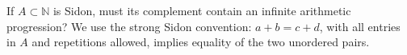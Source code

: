 If $A\subset\mathbb N$ is Sidon, must its complement contain an infinite arithmetic progression? We use the strong Sidon convention: $a+b=c+d$, with all entries in $A$ and repetitions allowed, implies equality of the two unordered pairs.
